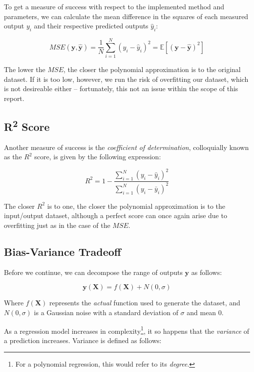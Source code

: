 \documentclass[a4paper,10pt,english]{article}
\begin{document}
\begin{multicols*}{2}
To get a measure of success with respect to the implemented method and parameters, we can calculate the mean difference in the squares of each measured output $y_i$ and their respective predicted outputs $\hat{y}_i$:

\begin{equation*}
MSE(\mathbf{y}, \mathbf{\hat{y}}) = \frac{1}{N} \sum_{i=1}^{N} (y_i - \hat{y}_i)^2 = \mathbb{E}\left[(\mathbf{y}-\hat{\mathbf{y}})^{2}\right]
\end{equation*}

The lower the $MSE$, the closer the polynomial approximation is to the original dataset.  If it is too low, however, we run the risk of overfitting our dataset, which is not desireable either – fortunately, this not an issue within the scope of this report.

\subsection*{R\textsuperscript{2} Score}

Another measure of success is the \textit{coefficient of determination}, colloquially known as the $R^2$ score, is given by the following expression:

\begin{equation*}
R^2 = 1 - \frac{\sum_{i=1}^N (y_i - \hat{y}_i)^2 }{\sum_{i=1}^N (y_i - \bar{y}_i)^2 }
\end{equation*}

The closer $R^2$ is to one, the closer the polynomial approximation is to the input/output dataset, although a perfect score can once again arise due to overfitting just as in the case of the $MSE$.

\subsection*{Bias-Variance Tradeoff}

Before we continue, we can decompose the range of outputs $\mathbf{y}$ as follows:

\begin{equation}
\label{eq_method_5}
\mathbf{y}(\mathbf{X}) = f(\mathbf{X}) + N(0, \sigma) 
\end{equation}

Where $f(\mathbf{X})$ represents the \textit{actual} function used to generate the dataset, and $N(0,\sigma)$ is a Gaussian noise with a standard deviation of $\sigma$ and mean 0.

As a regression model increases in complexity\footnote{For a polynomial regression, this would refer to its \textit{degree}.}, it so happens that the \textit{variance} of a prediction increases.  Variance is defined as follows:


\end{multicols*}
\end{document}
